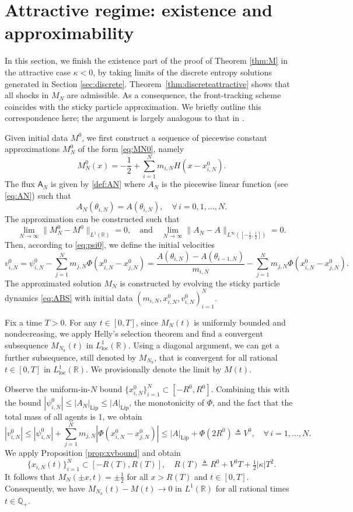 \documentclass[10pt,a4paper]{amsart}
\def\R{\mathbb{R}}
\def\loc{\mathrm{loc}}
\def\A{\mathsf{A}}
\DeclareMathOperator{\Lip}{Lip}
\begin{document}
	
	
	
	\section{Attractive regime: existence and approximability}
	\label{sec:gendata}
	
	In this section, we finish the existence part of the proof of Theorem \ref{thm:M} in the attractive case $\kappa<0$, by taking limits of the discrete entropy solutions generated in Section \ref{sec:discrete}.  Theorem~\ref{thm:discreteattractive} shows that all shocks in $M_N$ are admissible. As a consequence, the front-tracking scheme coincides with the sticky particle approximation. We briefly outline this correspondence here; the argument is largely analogous to that in \cite{leslie2023sticky}.
	
	Given initial data $M^0$, we first construct a sequence of piecewise constant approximations $M_N^0$ of the form \eqref{eq:MN0}, namely
	\[
	M_N^0(x) = -\frac12 + \sum_{i=1}^{N} m_{i,N} H(x - x_{i,N}^0).
	\]
	The flux $\A_N$ is given by \eqref{def:AN} where $A_N$ is the piecewise linear function (see \eqref{eq:AN}) such that
	\[
	A_N(\theta_{i,N}) = A(\theta_{i,N}),\quad \forall\,i=0,1,\ldots,N.
	\]
	The approximation can be constructed such that
	\[
	\lim_{N\to\infty}\|M_N^0-M^0\|_{L^1(\R)}=0,\quad\text{and}\quad
	\lim_{N\to\infty}\|A_N-A\|_{L^\infty([-\frac12,\frac12])}=0.
	\]
	Then, according to \eqref{eq:psi0}, we define the initial velocities 
	\[
	v_{i,N}^0 = \psi_{i,N}^0 - \sum_{j=1}^{N} m_{j,N} \Phi(x_{i,N}^0 - x_{j,N}^0)
	= \frac{A(\theta_{i,N})-A(\theta_{i-1,N})}{m_{i,N}} - \sum_{j=1}^{N} m_{j,N} \Phi(x_{i,N}^0 - x_{j,N}^0).
	\]
	The approximated solution $M_N$ is constructed by evolving the sticky particle dynamics \eqref{eq:ABS} with initial data $(m_{i,N},x_{i,N}^0,v_{i,N}^0)_{i=1}^N$.
	
	Fix a time $T>0$. For any $t\in[0,T]$, since $M_N(t)$ is uniformly bounded and nondecreasing, we apply Helly's selection theorem and find a convergent subsequence $M_{N_k}(t)$ in $L^1_{\loc}(\R)$. Using a diagonal argument, we can get a further subsequence, still denoted by $M_{N_k}$, that is convergent for all rational $t\in[0,T]$ in $L^1_{\loc}(\R)$.  We provisionally denote the limit by $M(t)$.
	
	Observe the uniform-in-$N$ bound $\{x_{i,N}^0\}_{i=1}^N\subset [-R^0, R^0]$.  Combining this with the bound $|\psi_{i,N}^0|\le |A_N|_{\Lip} \le |A|_{\Lip}$, the monotonicity of $\Phi$, and the fact that the total mass of all agents is $1$, we obtain 
	\[
	|v_{i,N}^0| \le |\psi_{i,N}^0| + \sum_{j=1}^N m_{j,N} |\Phi(x_{i,N}^0 - x_{j,N}^0)| \le |A|_{\Lip}  + \Phi(2R^0) \triangleq V^0,\quad \forall\, i=1,\ldots,N.
	\]
	We apply Proposition \ref{prop:xvbound} and obtain 
	\[
	\{x_{i,N}(t)\}_{i=1}^N\subset [-R(T),R(T)],\quad R(T) \triangleq R^0 + V^0T +\tfrac12|\kappa| T^2.
	\]
	It follows that $M_N(\pm x,t)=\pm\tfrac12$ for all $x>R(T)$ and $t\in[0,T]$. Consequently, we have $M_{N_k}(t)-M(t)\to 0$ in $L^1(\R)$ for all rational times $t\in \mathbb{Q}_+$.
	
\end{document}
